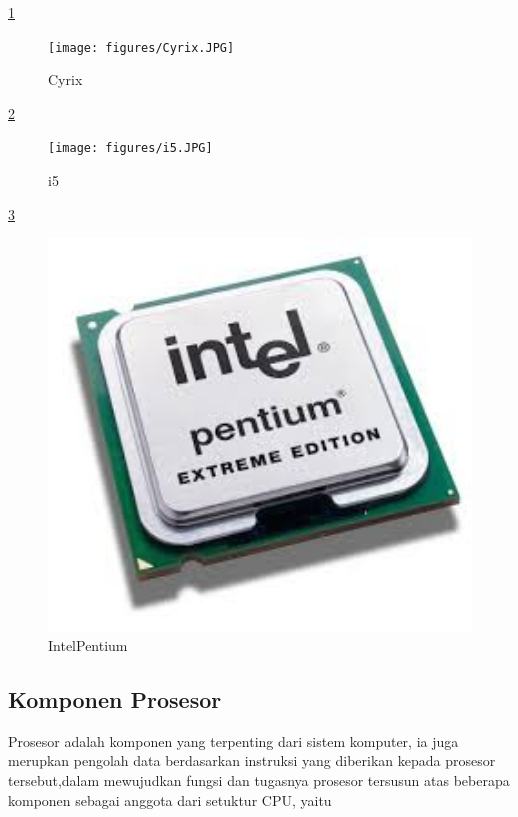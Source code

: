 \ref{Cyrix}
\begin{figure}[ht]
\centerline{\texttt{[image: figures/Cyrix.JPG]}}
\caption{Cyrix}
\label{Cyrix}
\end{figure}

\ref{i5}
\begin{figure}[ht]
\centerline{\texttt{[image: figures/i5.JPG]}}
\caption{i5}
\label{i5}
\end{figure}

\ref{IntelPentium}
\begin{figure}[ht]
\centerline{\includegraphics[width=1\textwidth]{figures/IntelPentium.JPG}}
\caption{IntelPentium}
\label{IntelPentium}
\end{figure}

\subsection{Komponen Prosesor}
Prosesor adalah komponen yang terpenting dari sistem komputer, ia juga merupkan pengolah data berdasarkan instruksi yang diberikan kepada
prosesor tersebut,dalam mewujudkan fungsi dan tugasnya prosesor tersusun atas beberapa komponen sebagai anggota dari setuktur CPU, yaitu

